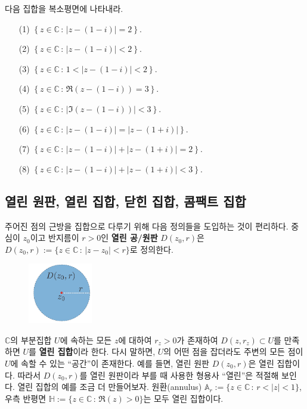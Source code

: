 \begin{salt_exercise} \label{ex-1-23}
다음 집합을 복소평면에 나타내라.
\begin{itemize}
\item[(1)] $\left\{z\in\mathbb C\,:\, |z-(1-i)| = 2 \right\}$.
\item[(2)] $\left\{z\in\mathbb C\,:\, |z-(1-i)| < 2 \right\}$.
\item[(3)] $\left\{z\in\mathbb C\,:\, 1< |z-(1-i)| < 2 \right\}$.
\item[(4)] $\left\{z\in\mathbb C\,:\, \Re(z-(1-i)) = 3 \right\}$.
\item[(5)] $\left\{z\in\mathbb C\,:\, |\Im(z-(1-i))| < 3 \right\}$.
\item[(6)] $\left\{z\in\mathbb C\,:\, |z-(1-i)| = |z-(1+i)| \right\}$.
\item[(7)] $\left\{z\in\mathbb C\,:\, |z-(1-i)| + |z-(1+i)| = 2 \right\}$.
\item[(8)] $\left\{z\in\mathbb C\,:\, |z-(1-i)| + |z-(1+i)| < 3 \right\}$.
\end{itemize}
\end{salt_exercise}

\subsection{열린 원판, 열린 집합, 닫힌 집합, 콤팩트 집합}

주어진 점의 근방을 집합으로 다루기 위해 다음 정의들을 도입하는 것이 편리하다.
중심이 $z_0$이고 반지름이 $r>0$인 {\bf 열린 공/원판} $D(z_0,r)$은 
$D(z_0,r) :=\{ z\in\mathbb C \,:\, |z-z_0| <r \}$로 정의한다.

\begin{figure}[!h]
\begin{center}
\includegraphics[width=0.25\textwidth]{./SaltChapter/figs/fig-1-0-1}
\end{center}
\end{figure}

$\mathbb C$의 부분집합 $U$에 속하는
모든 $z$에 대하여 $r_z>0$가 존재하여 $D(z,r_z)\subset U$를 만족하면
$U$를 {\bf 열린 집합}이라 한다.
다시 말하면, $U$의 어떤 점을 잡더라도 
주변의 모든 점이 $U$에 속할 수 있는 ``공간''이 존재한다.
예를 들면, 열린 원판 $D(z_0,r)$은 열린 집합이다.
따라서  $D(z_0,r)$를 열린 원판이라 부를 때 사용한 형용사 ``열린''은 적절해 보인다.
열린 집합의 예를 조금 더 만들어보자.
원환(annulus) $\mathbb A_r := \{ z\in\mathbb C\,:\, r<|z|<1\}$,
우측 반평면 $\mathbb H:= \{z\in\mathbb C\,:\, \Re(z)>0\}$는 모두 열린 집합이다.

